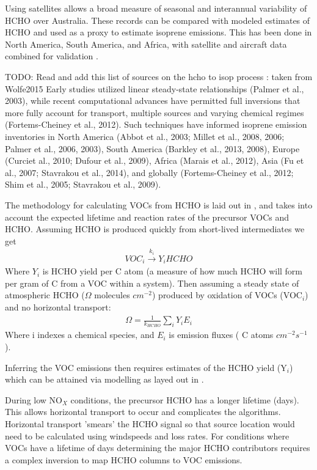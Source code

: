     Using satellites allows a broad measure of seasonal and interannual variability of HCHO over Australia. These records can be compared with modeled estimates of HCHO and used as a proxy to estimate isoprene emissions.
    This has been done in North America, South America, and Africa, with satellite and aircraft data combined for validation \citep{Millet_2006, Marais_2014}.
    
    TODO: Read and add this list of sources on the hcho to isop process : taken from Wolfe2015
    Early studies utilized linear steady-state relationships (Palmer et al., 2003), while recent computational advances have permitted full inversions that more fully account for transport, multiple sources and varying chemical regimes (Fortems-Cheiney et al., 2012). Such techniques have informed isoprene emission inventories in North America (Abbot et al., 2003; Millet et al., 2008, 2006; Palmer et al., 2006, 2003), South America (Barkley et al., 2013, 2008), Europe (Curciet al., 2010; Dufour et al., 2009), Africa (Marais et al., 2012), Asia (Fu et al., 2007; Stavrakou et al., 2014), and globally (Fortems-Cheiney et al., 2012; Shim et al., 2005; Stavrakou et al., 2009).

    The methodology for calculating VOCs from HCHO is laid out in \citet{Palmer_2003}, and takes into account the expected lifetime and reaction rates of the precursor VOCs and HCHO.
    Assuming HCHO is produced quickly from short-lived intermediates we get
    \begin{eqnarray*}
    VOC_i \overset{k_i}{\rightarrow} Y_i HCHO
    \end{eqnarray*}
    Where $Y_i$ is HCHO yield per C atom (a measure of how much HCHO will form per gram of C from a VOC within a system).
    Then assuming a steady state of atmospheric HCHO ($\Omega$ molecules $cm^{-2}$) produced by oxidation of VOCs (VOC$_i$) and no horizontal transport:
    \begin{eqnarray*}
    \Omega = \frac{1}{k_{HCHO}} \sum_{i} Y_i E_i
    \end{eqnarray*}
    Where i indexes a chemical species, and $E_i$ is emission fluxes ( C atoms $cm^{-2}s^{-1}$).

    Inferring the VOC emissions then requires estimates of the HCHO yield (Y$_i$) which can be attained via modelling as layed out in \citet{Millet_2006}.

    During low NO$_X$ conditions, the precursor HCHO has a longer lifetime (days).
    This allows horizontal transport to occur and complicates the algorithms.
    Horizontal transport 'smears' the HCHO signal so that source location would need to be calculated using windspeeds and loss rates.
    For conditions where VOCs have a lifetime of days determining the major HCHO contributors requires a complex inversion to map HCHO columns to VOC emissions.

